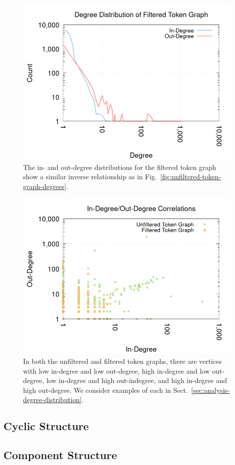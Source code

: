 \begin{figure}
  \centerline{\includegraphics[width=\columnwidth]{img/degree-distributions/filtered-token-graph-degrees.png}}
  \caption{The in- and out-degree distributions for the filtered token
    graph show a similar inverse relationship as in
    Fig.~\ref{fig:unfiltered-token-graph-degrees}.}\label{fig:filtered-token-graph-degrees}
\end{figure}

\begin{figure}
  \centerline{\includegraphics[width=\columnwidth]{img/degree-distributions/token-graph-in-out-degrees.png}}
  \caption{In both the unfiltered and filtered token graphs, there are
    vertices with low in-degree and low out-degree, high in-degree and
    low out-degree, low in-degree and high out-indegree, and high
    in-degree and high out-degree.  We consider examples of each in
    Sect.~\ref{sec:analysis-degree-distribution}.}\label{fig:token-graph-in-out-degrees}
\end{figure}

\subsection{Cyclic Structure}\label{sec:analysis-cyclic-structure}

\subsection{Component Structure}\label{sec:analysis-component-structure}
